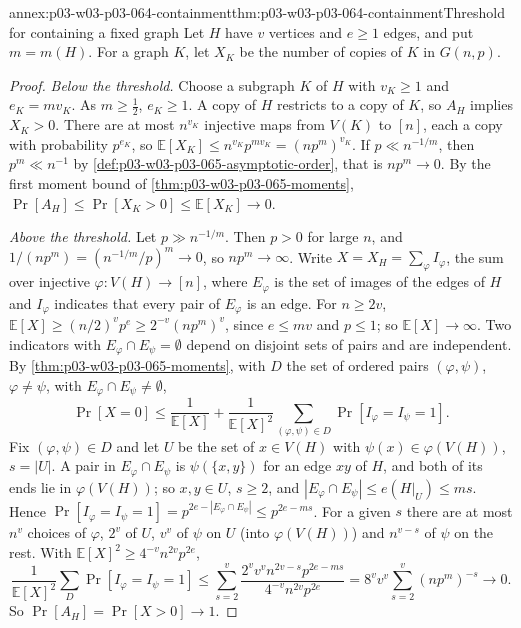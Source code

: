 \begin{annexitem}{annex:p03-w03-p03-064-containment}{thm:p03-w03-p03-064-containment}{Threshold for containing a fixed graph}
Let \(H\) have \(v\) vertices and \(e\geq1\) edges, and put \(m=m(H)\).  For
a graph \(K\), let \(X_K\) be the number of copies of \(K\) in
\(G(n,p)\).
\begin{proof}
\emph{Below the threshold.}  Choose a subgraph \(K\) of \(H\) with
\(v_K\geq1\) and \(e_K=mv_K\).  As \(m\geq\frac12\), \(e_K\geq1\).  A copy
of \(H\) restricts to a copy of \(K\), so \(A_H\) implies \(X_K>0\).  There
are at most \(n^{v_K}\) injective maps from \(V(K)\) to \([n]\), each a copy
with probability \(p^{e_K}\), so \(\mathbb E[X_K]\leq n^{v_K}p^{mv_K}
=(np^m)^{v_K}\).  If \(p\ll n^{-1/m}\), then \(p^m\ll n^{-1}\) by
\cref{def:p03-w03-p03-065-asymptotic-order}, that is \(np^m\to0\).  By the
first moment bound of \cref{thm:p03-w03-p03-065-moments},
\(\Pr[A_H]\leq\Pr[X_K>0]\leq\mathbb E[X_K]\to0\).

\emph{Above the threshold.}  Let \(p\gg n^{-1/m}\).  Then \(p>0\) for large
\(n\), and \(1/(np^m)=(n^{-1/m}/p)^m\to0\), so \(np^m\to\infty\).  Write
\(X=X_H=\sum_\varphi I_\varphi\), the sum over injective
\(\varphi:V(H)\to[n]\), where \(E_\varphi\) is the set of images of the
edges of \(H\) and \(I_\varphi\) indicates that every pair of \(E_\varphi\)
is an edge.  For \(n\geq2v\), \(\mathbb E[X]\geq(n/2)^vp^e\geq
2^{-v}(np^m)^v\), since \(e\leq mv\) and \(p\leq1\); so
\(\mathbb E[X]\to\infty\).  Two indicators with
\(E_\varphi\cap E_\psi=\emptyset\) depend on disjoint sets of pairs and are
independent.  By \cref{thm:p03-w03-p03-065-moments}, with \(D\) the set of
ordered pairs \((\varphi,\psi)\), \(\varphi\neq\psi\), with
\(E_\varphi\cap E_\psi\neq\emptyset\),
\[
  \Pr[X=0]\leq\frac{1}{\mathbb E[X]}+\frac{1}{\mathbb E[X]^2}
  \sum_{(\varphi,\psi)\in D}\Pr[I_\varphi=I_\psi=1].
\]
Fix \((\varphi,\psi)\in D\) and let \(U\) be the set of \(x\in V(H)\) with
\(\psi(x)\in\varphi(V(H))\), \(s=|U|\).  A pair in \(E_\varphi\cap E_\psi\)
is \(\psi(\{x,y\})\) for an edge \(xy\) of \(H\), and both of its ends lie in
\(\varphi(V(H))\); so \(x,y\in U\), \(s\geq2\), and
\(|E_\varphi\cap E_\psi|\leq e(H|_U)\leq ms\).  Hence
\(\Pr[I_\varphi=I_\psi=1]=p^{2e-|E_\varphi\cap E_\psi|}\leq p^{2e-ms}\).
For a given \(s\) there are at most \(n^v\) choices of \(\varphi\),
\(2^v\) of \(U\), \(v^v\) of \(\psi\) on \(U\) (into \(\varphi(V(H))\)) and
\(n^{v-s}\) of \(\psi\) on the rest.  With
\(\mathbb E[X]^2\geq4^{-v}n^{2v}p^{2e}\),
\[
  \frac{1}{\mathbb E[X]^2}\sum_{D}\Pr[I_\varphi=I_\psi=1]
  \leq\sum_{s=2}^{v}\frac{2^vv^vn^{2v-s}p^{2e-ms}}{4^{-v}n^{2v}p^{2e}}
  =8^vv^v\sum_{s=2}^{v}(np^m)^{-s}\longrightarrow0 .
\]
So \(\Pr[A_H]=\Pr[X>0]\to1\).
\end{proof}
\end{annexitem}

